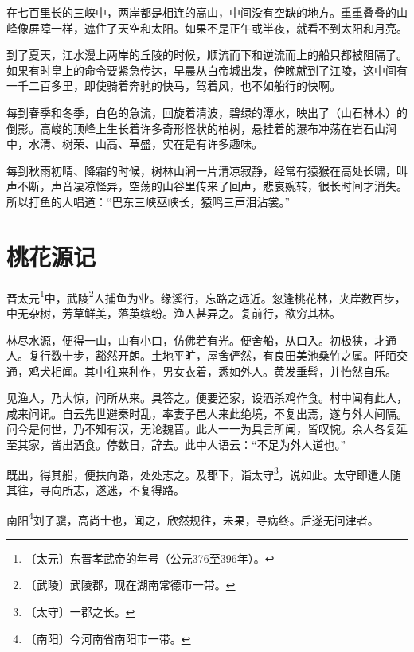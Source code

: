 \documentclass[12pt,UTF-8,openany,a4]{ctexbook}
\begin{document}
\begin{large}\yiwen
    
    在七百里长的三峡中，两岸都是相连的高山，中间没有空缺的地方。重重叠叠的山峰像屏障一样，遮住了天空和太阳。如果不是正午或半夜，就看不到太阳和月亮。
    
    到了夏天，江水漫上两岸的丘陵的时候，顺流而下和逆流而上的船只都被阻隔了。 如果有时皇上的命令要紧急传达，早晨从白帝城出发，傍晚就到了江陵，这中间有一千二百多里，即使骑着奔驰的快马，驾着风，也不如船行的快啊。
    
    每到春季和冬季，白色的急流，回旋着清波，碧绿的潭水，映出了（山石林木）的倒影。高峻的顶峰上生长着许多奇形怪状的柏树，悬挂着的瀑布冲荡在岩石山涧中，水清、树荣、山高、草盛，实在是有许多趣味。
    
    每到秋雨初晴、降霜的时候，树林山涧一片清凉寂静，经常有猿猴在高处长啸，叫声不断，声音凄凉怪异，空荡的山谷里传来了回声，悲哀婉转，很长时间才消失。所以打鱼的人唱道：“巴东三峡巫峡长，猿鸣三声泪沾裳。”
    

\end{large}



\chapter{桃花源记}

\begin{large}
    
    晋太元\footnote{〔太元〕\yiwen 东晋孝武帝的年号（公元376至396年）。}中，武陵\footnote{〔武陵〕\yiwen 武陵郡，现在湖南常德市一带。}人捕鱼为业。缘溪行，忘路之远近。忽逢桃花林，夹岸数百步，中无杂树，芳草鲜美，落英缤纷。渔人甚异之。复前行，欲穷其林。
    
    林尽水源，便得一山，山有小口，仿佛若有光。便舍船，从口入。初极狭，才通人。复行数十步，豁然开朗。土地平旷，屋舍俨然，有良田美池桑竹之属。阡陌交通，鸡犬相闻。其中往来种作，男女衣着，悉如外人。黄发垂髫，并怡然自乐。
    
    见渔人，乃大惊，问所从来。具答之。便要还家，设酒杀鸡作食。村中闻有此人，咸来问讯。自云先世避秦时乱，率妻子邑人来此绝境，不复出焉，遂与外人间隔。问今是何世，乃不知有汉，无论魏晋。此人一一为具言所闻，皆叹惋。余人各复延至其家，皆出酒食。停数日，辞去。此中人语云：“不足为外人道也。”
    
    既出，得其船，便扶向路，处处志之。及郡下，诣太守\footnote{〔太守〕\yiwen 一郡之长。}，说如此。太守即遣人随其往，寻向所志，遂迷，不复得路。
    
    南阳\footnote{〔南阳〕\yiwen 今河南省南阳市一带。}刘子骥，高尚士也，闻之，欣然规往，未果，寻病终。后遂无问津者。

\end{large}
\end{document}
